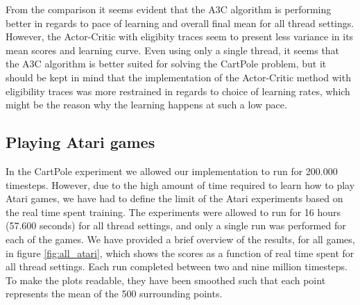 \documentclass[11pt]{article}
\begin{document}
From the comparison it seems evident that the A3C algorithm is performing
better in regards to pace of learning and overall final mean for all thread settings.
However, the Actor-Critic with eligibity traces seem to present less variance
in its mean scores and learning curve.
Even using only a single thread, it seems that the A3C algorithm
is better suited for solving the CartPole problem, but it should
be kept in mind that the implementation of the Actor-Critic method
with eligibility traces was more restrained in regards to choice of
learning rates, which might be the reason why the learning happens
at such a low pace.

\subsection{Playing Atari games}

In the CartPole experiment we allowed our implementation to run for 200.000 timesteps.
However, due to the high amount of time required to
learn how to play Atari games, we have had to define the limit of the
Atari experiments based on the real time spent training.
The experiments were allowed to run for 16 hours (57.600 seconds)
for all thread settings, and only a single run was performed for
each of the games.
We have provided a brief overview of the results, for all games, in figure \ref{fig:all_atari},
which shows the scores as a function of real time spent for all
thread settings.
Each run completed between two and nine million timesteps.
To make the plots readable, they have been smoothed such that
each point represents the mean of the 500 surrounding points.
\end{document}
